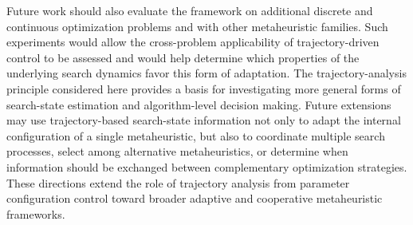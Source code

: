 \documentclass[journal,article,submit,moreauthors]{Definitions/mdpi}
\begin{document}
Future work should also evaluate the framework on additional discrete and
continuous optimization problems and with other metaheuristic families.
Such experiments would allow the cross-problem applicability of
trajectory-driven control to be assessed and would help determine which
properties of the underlying search dynamics favor this form of adaptation. The trajectory-analysis principle considered here provides a basis
for investigating more general forms of search-state estimation and
algorithm-level decision making. Future extensions may use trajectory-based
search-state information not only to adapt the internal configuration of a
single metaheuristic, but also to coordinate multiple search processes,
select among alternative metaheuristics, or determine when information
should be exchanged between complementary optimization strategies. These
directions extend the role of trajectory analysis from parameter
configuration control toward broader adaptive and cooperative
metaheuristic frameworks.


\vspace{6pt} 




\end{document}
